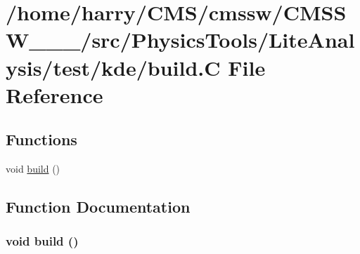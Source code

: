 \hypertarget{build_8C}{
\section{/home/harry/CMS/cmssw/CMSSW\_\_\_/src/Physics\-Tools/Lite\-Analysis/test/kde/build.C File Reference}
\label{build_8C}
}


\subsection*{Functions}
\begin{CompactItemize}
\item 
void \hyperlink{build_8C_a0}{build} ()
\end{CompactItemize}


\subsection{Function Documentation}
\hypertarget{build_8C_a0}{
\subsubsection[build]{\setlength{\rightskip}{0pt plus 5cm}void build ()}}
\label{build_8C_a0}


